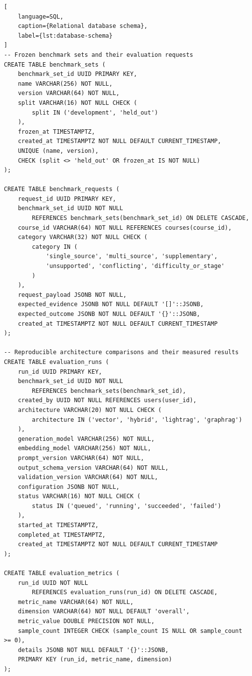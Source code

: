 \documentclass[12pt,a4paper]{article}
\begin{document}
\begin{lstlisting}[
    language=SQL,
    caption={Relational database schema},
    label={lst:database-schema}
]
-- Frozen benchmark sets and their evaluation requests
CREATE TABLE benchmark_sets (
    benchmark_set_id UUID PRIMARY KEY,
    name VARCHAR(256) NOT NULL,
    version VARCHAR(64) NOT NULL,
    split VARCHAR(16) NOT NULL CHECK (
        split IN ('development', 'held_out')
    ),
    frozen_at TIMESTAMPTZ,
    created_at TIMESTAMPTZ NOT NULL DEFAULT CURRENT_TIMESTAMP,
    UNIQUE (name, version),
    CHECK (split <> 'held_out' OR frozen_at IS NOT NULL)
);

CREATE TABLE benchmark_requests (
    request_id UUID PRIMARY KEY,
    benchmark_set_id UUID NOT NULL
        REFERENCES benchmark_sets(benchmark_set_id) ON DELETE CASCADE,
    course_id VARCHAR(64) NOT NULL REFERENCES courses(course_id),
    category VARCHAR(32) NOT NULL CHECK (
        category IN (
            'single_source', 'multi_source', 'supplementary',
            'unsupported', 'conflicting', 'difficulty_or_stage'
        )
    ),
    request_payload JSONB NOT NULL,
    expected_evidence JSONB NOT NULL DEFAULT '[]'::JSONB,
    expected_outcome JSONB NOT NULL DEFAULT '{}'::JSONB,
    created_at TIMESTAMPTZ NOT NULL DEFAULT CURRENT_TIMESTAMP
);

-- Reproducible architecture comparisons and their measured results
CREATE TABLE evaluation_runs (
    run_id UUID PRIMARY KEY,
    benchmark_set_id UUID NOT NULL
        REFERENCES benchmark_sets(benchmark_set_id),
    created_by UUID NOT NULL REFERENCES users(user_id),
    architecture VARCHAR(20) NOT NULL CHECK (
        architecture IN ('vector', 'hybrid', 'lightrag', 'graphrag')
    ),
    generation_model VARCHAR(256) NOT NULL,
    embedding_model VARCHAR(256) NOT NULL,
    prompt_version VARCHAR(64) NOT NULL,
    output_schema_version VARCHAR(64) NOT NULL,
    validation_version VARCHAR(64) NOT NULL,
    configuration JSONB NOT NULL,
    status VARCHAR(16) NOT NULL CHECK (
        status IN ('queued', 'running', 'succeeded', 'failed')
    ),
    started_at TIMESTAMPTZ,
    completed_at TIMESTAMPTZ,
    created_at TIMESTAMPTZ NOT NULL DEFAULT CURRENT_TIMESTAMP
);

CREATE TABLE evaluation_metrics (
    run_id UUID NOT NULL
        REFERENCES evaluation_runs(run_id) ON DELETE CASCADE,
    metric_name VARCHAR(64) NOT NULL,
    dimension VARCHAR(64) NOT NULL DEFAULT 'overall',
    metric_value DOUBLE PRECISION NOT NULL,
    sample_count INTEGER CHECK (sample_count IS NULL OR sample_count >= 0),
    details JSONB NOT NULL DEFAULT '{}'::JSONB,
    PRIMARY KEY (run_id, metric_name, dimension)
);


\end{lstlisting}
\end{document}
